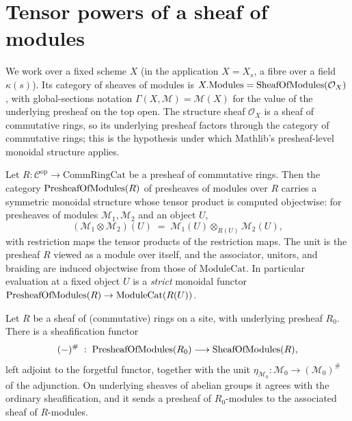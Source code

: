 \section{Tensor powers of a sheaf of modules}
\label{mk-sec:sgr_tensor_powers}

We work over a fixed scheme \(X\) (in the application \(X = X_s\), a fibre over a
field \(\kappa(s)\)). Its category of sheaves of modules is
\(X.\mathrm{Modules} = \mathrm{SheafOfModules}(\mathcal{O}_X)\), with global-sections notation
\(\Gamma(X, \mathcal{M}) = \mathcal{M}(X)\) for the value of the underlying
presheaf on the top open. The structure sheaf \(\mathcal{O}_X\) is a sheaf of
commutative rings, so its underlying presheaf factors through the category of
commutative rings; this is the hypothesis under which Mathlib's presheaf-level
monoidal structure applies.

\begin{lemma}
  \label{mk-lem:presheafModule_monoidal_mathlib}
  \mathlibok

  Let \(R : \mathcal{C}^{\mathrm{op}} \to \mathrm{CommRingCat}\) be a presheaf of
  commutative rings. Then the category \(\mathrm{PresheafOfModules}(R)\) of presheaves of modules
  over \(R\) carries a symmetric monoidal structure whose tensor product is
  computed objectwise: for presheaves of modules \(\mathcal{M}_1, \mathcal{M}_2\)
  and an object \(U\),
  \[
    (\mathcal{M}_1 \otimes \mathcal{M}_2)(U)
      \;=\; \mathcal{M}_1(U) \otimes_{R(U)} \mathcal{M}_2(U),
  \]
  with restriction maps the tensor products of the restriction maps. The unit is
  the presheaf \(R\) viewed as a module over itself, and the associator,
  unitors, and braiding are induced objectwise from those of
  \(\mathrm{ModuleCat}\). In particular evaluation at a fixed object \(U\) is a
  \emph{strict} monoidal functor
  \(\mathrm{PresheafOfModules}(R) \to \mathrm{ModuleCat}(R(U))\).
\end{lemma}

\begin{lemma}
  \label{mk-lem:presheafModule_sheafification_mathlib}
  \mathlibok

  Let \(R\) be a sheaf of (commutative) rings on a site, with underlying
  presheaf \(R_0\). There is a sheafification functor
  \[
    (-)^{\#} \;:\; \mathrm{PresheafOfModules}(R_0) \longrightarrow \mathrm{SheafOfModules}(R),
  \]
  left adjoint to the forgetful functor, together with the unit
  \(\eta_{\mathcal{M}_0} : \mathcal{M}_0 \to (\mathcal{M}_0)^{\#}\) of the
  adjunction. On underlying sheaves of abelian groups it agrees with the
  ordinary sheafification, and it sends a presheaf of \(R_0\)-modules to the
  associated sheaf of \(R\)-modules.
\end{lemma}

